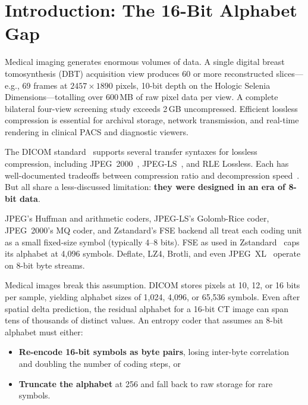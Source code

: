 \documentclass[10pt,twocolumn]{article}
\begin{document}
\begin{abstract}
We evaluate MIC on 21 clinical DICOM datasets spanning MR, CT, CR, X-ray,
mammography, nuclear medicine, radiography, secondary capture, and fluoroscopy
(XA) using fair in-process benchmarking via CGO bindings against HTJ2K
(OpenJPH), JPEG-LS (CharLS), and Delta+Zstandard. MIC achieves compression
ratios of 1.7$\times$--8.9$\times$. MIC-4state-C exceeds HTJ2K decompression
speed on 19/21 images single-threaded (ARM64) and 16/21 (AMD64, AVX2). PICS-C-8
exceeds HTJ2K on \textbf{all 21 images} on both platforms.
\end{abstract}

\section{Introduction: The 16-Bit Alphabet Gap}
\label{sec:intro}

Medical imaging generates enormous volumes of data. A single digital breast
tomosynthesis (DBT) acquisition view produces 60 or more reconstructed
slices---e.g., 69 frames at $2457 \times 1890$ pixels, 10-bit depth on the
Hologic Selenia Dimensions---totalling over 600\,MB of raw pixel data per view.
A complete bilateral four-view screening study exceeds 2\,GB uncompressed.
Efficient lossless compression is essential for archival storage, network
transmission, and real-time rendering in clinical PACS and diagnostic viewers.

The DICOM standard~\cite{dicom} supports several transfer syntaxes for lossless
compression, including JPEG~2000~\cite{taubman2002}, JPEG-LS~\cite{loco1}, and
RLE Lossless. Each has well-documented tradeoffs between compression ratio and
decompression speed~\cite{liu2017,clunie2000}. But all share a less-discussed
limitation: \textbf{they were designed in an era of 8-bit data}.

JPEG's Huffman and arithmetic coders, JPEG-LS's Golomb-Rice coder, JPEG~2000's
MQ coder, and Zstandard's FSE backend all treat each coding unit as a small
fixed-size symbol (typically 4--8 bits). FSE as used in Zstandard~\cite{rfc8878}
caps its alphabet at 4,096 symbols. Deflate, LZ4, Brotli, and even
JPEG~XL~\cite{jpegxl} operate on 8-bit byte streams.

Medical images break this assumption. DICOM stores pixels at 10, 12, or 16 bits
per sample, yielding alphabet sizes of 1,024, 4,096, or 65,536 symbols. Even
after spatial delta prediction, the residual alphabet for a 16-bit CT image can
span tens of thousands of distinct values. An entropy coder that assumes an
8-bit alphabet must either:
\begin{itemize}
  \item \textbf{Re-encode 16-bit symbols as byte pairs}, losing inter-byte
  correlation and doubling the number of coding steps, or
  \item \textbf{Truncate the alphabet} at 256 and fall back to raw storage for
  rare symbols.
\end{itemize}
\end{document}

